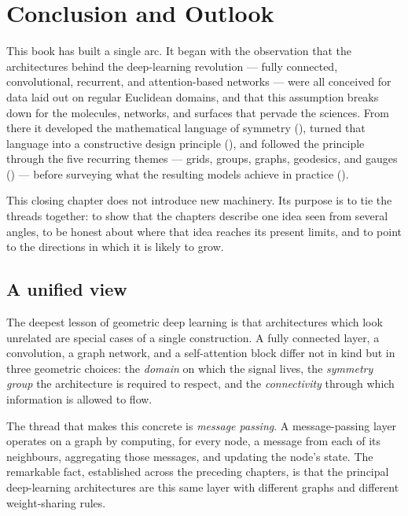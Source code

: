 \chapter{Conclusion and Outlook}
\label{ch:conclusion}

\providecommand{\WL}{\textsc{wl}}

This book has built a single arc. It began with the observation that the
architectures behind the deep-learning revolution --- fully connected,
convolutional, recurrent, and attention-based networks --- were all conceived
for data laid out on regular Euclidean domains, and that this assumption breaks
down for the molecules, networks, and surfaces that pervade the sciences. From
there it developed the mathematical language of symmetry
(), turned that language into a constructive design
principle (), and followed the principle through the five
recurring themes --- grids, groups, graphs, geodesics, and gauges
() --- before
surveying what the resulting models achieve in practice ().

This closing chapter does not introduce new machinery. Its purpose is to tie the
threads together: to show that the chapters describe one idea seen from several
angles, to be honest about where that idea reaches its present limits, and to
point to the directions in which it is likely to grow.

\section{A unified view}
\label{sec:concl:unified}

The deepest lesson of geometric deep learning is that architectures which look
unrelated are special cases of a single construction. A fully connected layer, a
convolution, a graph network, and a self-attention block differ not in kind but
in three geometric choices: the \emph{domain} on which the signal lives, the
\emph{symmetry group} the architecture is required to respect, and the
\emph{connectivity} through which information is allowed to flow.

The thread that makes this concrete is \emph{message passing}. A message-passing
layer operates on a graph by computing, for every node, a message from each of
its neighbours, aggregating those messages, and updating the node's state. The
remarkable fact, established across the preceding chapters, is that the principal
deep-learning architectures are this same layer with different graphs and
different weight-sharing rules.

